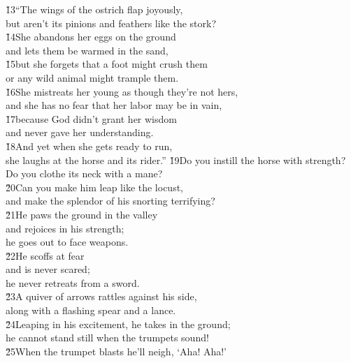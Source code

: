 \begin{poetry}
\poeml \v{13}``The wings of the ostrich flap joyously, \\
\poemll    but aren't its pinions and feathers like the stork? \\
\poeml \v{14}She abandons her eggs on the ground \\
\poemll    and lets them be warmed in the sand, \\
\poeml \v{15}but she forgets that a foot might crush them \\
\poemll    or any wild animal might trample them. \\
\poeml \v{16}She mistreats her young as though they're not hers, \\
\poemll    and she has no fear that her labor may be in vain, \\
\poeml \v{17}because God didn't grant her wisdom \\
\poemll    and never gave her understanding. \\
\poeml \v{18}And yet when she gets ready to run, \\
\poemll    she laughs at the horse and its rider.''
\poeml \v{19}Do you instill the horse with strength? \\
\poemll    Do you clothe its neck with a mane? \\
\poeml \v{20}Can you make him leap like the locust, \\
\poemll    and make the splendor of his snorting terrifying? \\
\poeml \v{21}He paws the ground in the valley \\
\poemll    and rejoices in his strength; \\
\poemlll       he goes out to face weapons. \\
\poeml \v{22}He scoffs at fear \\
\poemll    and is never scared; \\
\poemlll       he never retreats from a sword. \\
\poeml \v{23}A quiver of arrows rattles against his side, \\
\poemll    along with a flashing spear and a lance. \\
\poeml \v{24}Leaping in his excitement, he takes in the ground; \\
\poemll    he cannot stand still when the trumpets sound! \\
\poeml \v{25}When the trumpet blasts he'll neigh, `Aha! Aha!' \\

\end{poetry}
